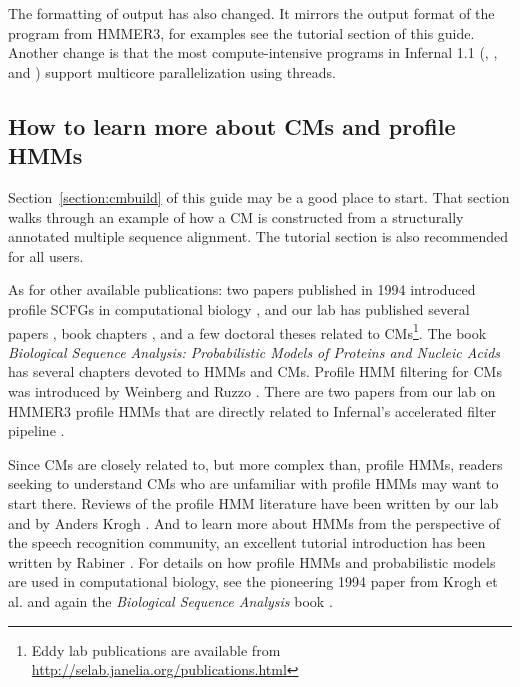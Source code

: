 The formatting of  output has also changed. It mirrors
the output format of the  program from HMMER3, for
examples see the tutorial section of this guide. Another change is
that the most compute-intensive programs in Infernal 1.1
(, ,  and
) support multicore parallelization using threads.

\subsection{How to learn more about CMs and profile HMMs}

Section~\ref{section:cmbuild} of this guide may be a good place to
start. That section walks through an example of how a CM is
constructed from a structurally annotated multiple sequence alignment.
The tutorial section is also recommended for all users.

As for other available publications: two papers published in 1994
introduced profile SCFGs in computational biology
\citep{Sakakibara94c,Eddy94}, and our lab has published several papers
\citep{Eddy02b,KleinEddy03,NawrockiEddy07,Nawrocki09,KolbeEddy09,KolbeEddy11},
book chapters \citep{Eddy06b,NawrockiEddy09}, and a few doctoral
theses \citep{Klein03,Nawrocki09b,Kolbe10} related to
CMs\footnote{Eddy lab publications are available from
\url{http://selab.janelia.org/publications.html}}. The book
\emph{Biological Sequence Analysis: Probabilistic Models of Proteins
and Nucleic Acids} \citep{Durbin98} has several chapters devoted to
HMMs and CMs. Profile HMM filtering for CMs was introduced by Weinberg
and Ruzzo
\citep{WeinbergRuzzo04,WeinbergRuzzo04b,WeinbergRuzzo06}. There are
two papers from our lab on HMMER3 profile HMMs that are directly
related to Infernal's accelerated filter pipeline
\citep{Eddy08,Eddy11}.

Since CMs are closely related to, but more complex than, profile HMMs,
readers seeking to understand CMs who are unfamiliar with profile HMMs
may want to start there.  Reviews of the profile HMM literature have
been written by our lab \citep{Eddy96,Eddy98} and by Anders Krogh
\citep{Krogh98}. And to learn more about HMMs from the perspective of
the speech recognition community, an excellent tutorial introduction
has been written by Rabiner \citep{Rabiner89}. For details on how
profile HMMs and probabilistic models are used in computational
biology, see the pioneering 1994 paper from Krogh et
al. \citep{Krogh94} and again the \emph{Biological Sequence Analysis}
book \citep{Durbin98}.

